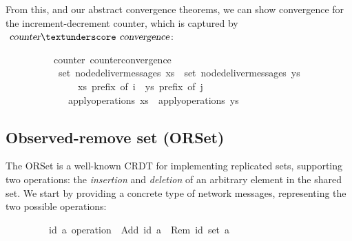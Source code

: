 \vspace{0.35em}
From this, and our abstract convergence theorems, we can show convergence for the increment-decrement counter, which is captured by $\isa{counter}{\isacharunderscore}\isa{convergence}$:
\vspace{0.35em}
\begin{isabellebody}
\ \ \ \ \ \ \ \ \ {\isacharparenleft}\ counter{\isacharparenright}\ counter{\isacharunderscore}convergence{\isacharcolon}\isanewline
\ \ \ \ \ \ \ \ \ \ \ {\isachardoublequoteopen}set\ {\isacharparenleft}node{\isacharunderscore}deliver{\isacharunderscore}messages\ xs{\isacharparenright}\ {\isacharequal}\ set\ {\isacharparenleft}node{\isacharunderscore}deliver{\isacharunderscore}messages\ ys{\isacharparenright}{\isachardoublequoteclose}\isanewline
\ \ \ \ \ \ \ \ \ \ \ \ \ \ \ {\isachardoublequoteopen}xs\ prefix\ of\ i{\isachardoublequoteclose}\ \ {\isachardoublequoteopen}ys\ prefix\ of\ j{\isachardoublequoteclose}\isanewline
\ \ \ \ \ \ \ \ \ \ \ \ \ {\isachardoublequoteopen}apply{\isacharunderscore}operations\ xs\ {\isacharequal}\ apply{\isacharunderscore}operations\ ys{\isachardoublequoteclose}
\end{isabellebody}

\subsection{Observed-remove set (ORSet)}
\label{subsect.orset}

The ORSet is a well-known CRDT for implementing replicated sets, supporting two operations: the \emph{insertion} and \emph{deletion} of an arbitrary element in the shared set.
We start by providing a concrete type of network messages, representing the two possible operations:
\vspace{0.35em}
\begin{isabellebody}
\ \ \ \ \ \ \ \ \ {\isacharparenleft}{\isacharprime}id{\isacharcomma}\ {\isacharprime}a{\isacharparenright}\ operation\ {\isacharequal}\ Add\ {\isachardoublequoteopen}{\isacharprime}id{\isachardoublequoteclose}\ {\isachardoublequoteopen}{\isacharprime}a{\isachardoublequoteclose}\ {\isacharbar}\ Rem\ {\isachardoublequoteopen}{\isacharparenleft}{\isacharprime}id\ set{\isacharparenright}{\isachardoublequoteclose}\ {\isachardoublequoteopen}{\isacharprime}a{\isachardoublequoteclose}
\end{isabellebody}
\vspace{0.35em}

